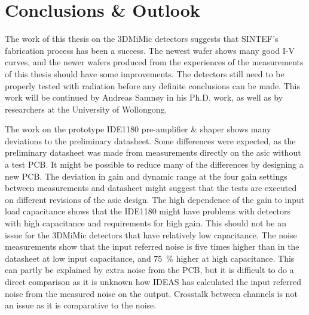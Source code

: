 \documentclass[../main/thesis.tex]{subfiles}
\begin{document}
\newchapter

\chapter{Conclusions \& Outlook}
\label{conc}

The work of this thesis on the 3DMiMic detectors suggests that SINTEF's fabrication process has been a success. The newest wafer shows many good I-V curves, and the newer wafers produced from the experiences of the measurements of this thesis should have some improvements. The detectors still need to be properly tested with radiation before any definite conclusions can be made. This work will be continued by Andreas Samnøy in his Ph.D. work, as well as by researchers at the University of Wollongong. 

The work on the prototype IDE1180 pre-amplifier \& shaper shows many deviations to the preliminary datasheet. Some differences were expected, as the preliminary datasheet was made from measurements directly on the \gls{asic} without a test \gls{PCB}. It might be possible to reduce many of the differences by designing a new PCB. The deviation in gain and dynamic range at the four gain settings between measurements and datasheet might suggest that the tests are executed on different revisions of the \gls{asic} design. The high dependence of the gain to input load capacitance shows that the IDE1180 might have problems with detectors with high capacitance and requirements for high gain. This should not be an issue for the 3DMiMic detectors that have relatively low capacitance. The noise measurements show that the input referred noise is five times higher than in the datasheet at low input capacitance, and 75~\% higher at high capacitance. This can partly be explained by extra noise from the \gls{PCB}, but it is difficult to do a direct comparison as it is unknown how IDEAS has calculated the input referred noise from the measured noise on the output. Crosstalk between channels is not an issue as it is comparative to the noise.
\end{document}
